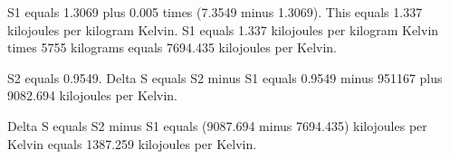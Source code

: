 S1 equals 1.3069 plus 0.005 times (7.3549 minus 1.3069).  
This equals 1.337 kilojoules per kilogram Kelvin.  
S1 equals 1.337 kilojoules per kilogram Kelvin times 5755 kilograms equals 7694.435 kilojoules per Kelvin.  

S2 equals 0.9549.  
Delta S equals S2 minus S1 equals 0.9549 minus 951167 plus 9082.694 kilojoules per Kelvin.  

Delta S equals S2 minus S1 equals (9087.694 minus 7694.435) kilojoules per Kelvin equals 1387.259 kilojoules per Kelvin.